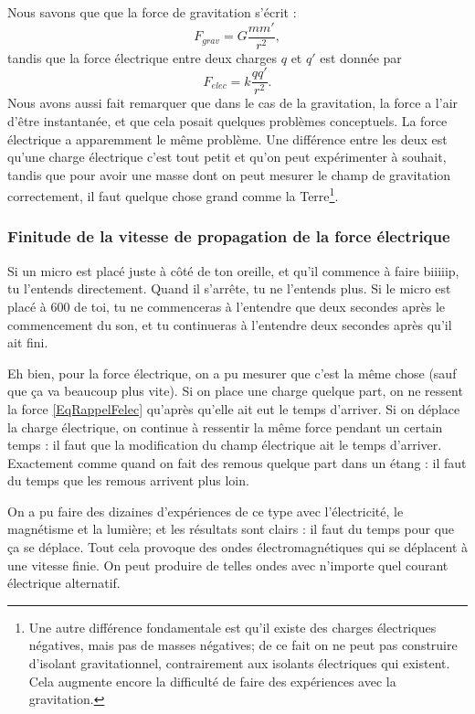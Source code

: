 Nous savons que que la force de gravitation s'écrit :
\[
	F_{grav}=G\frac{ mm' }{ r^2 },
\]
tandis que la force électrique entre deux charges \( q\) et \( q'\) est donnée par
\begin{equation}	\label{EqRappelFelec}
	F_{elec}=k\frac{ qq' }{ r^2 }.
\end{equation}
Nous avons aussi fait remarquer que dans le cas de la gravitation, la force a l'air d'être instantanée, et que cela posait quelques problèmes conceptuels. La force électrique a apparemment le même problème. Une différence entre les deux est qu'une charge électrique c'est tout petit et qu'on peut expérimenter à souhait, tandis que pour avoir une masse dont on peut mesurer le champ de gravitation correctement, il faut quelque chose grand comme la Terre\footnote{Une autre différence fondamentale est qu'il existe des charges électriques négatives, mais pas de masses négatives; de ce fait on ne peut pas construire d'isolant gravitationnel, contrairement aux isolants électriques qui existent. Cela augmente encore la difficulté de faire des expériences avec la gravitation.}.

\subsubsection{Finitude de la vitesse de propagation de la force électrique}

Si un micro est placé juste à côté de ton oreille, et qu'il commence à faire biiiiip, tu l'entends directement. Quand il s'arrête, tu ne l'entends plus. Si le micro est placé à \unit{600}{\meter} de toi, tu ne commenceras à l'entendre que deux secondes après le commencement du son, et tu continueras à l'entendre deux secondes après qu'il ait fini.

Eh bien, pour la force électrique, on a pu mesurer que c'est la même chose (sauf que ça va beaucoup plus vite). Si on place une charge quelque part, on ne ressent la force \eqref{EqRappelFelec} qu'après qu'elle ait eut le temps d'arriver. Si on déplace la charge électrique, on continue à ressentir la même force pendant un certain temps : il faut que la modification du champ électrique ait le temps d'arriver. Exactement comme quand on fait des remous quelque part dans un étang : il faut du temps que les remous arrivent plus loin.

On a pu faire des dizaines d'expériences de ce type avec l'électricité, le magnétisme et la lumière; et les résultats sont clairs : il faut du temps pour que ça se déplace. Tout cela provoque des ondes électromagnétiques qui se déplacent à une vitesse finie. On peut produire de telles ondes avec n'importe quel courant électrique alternatif.

